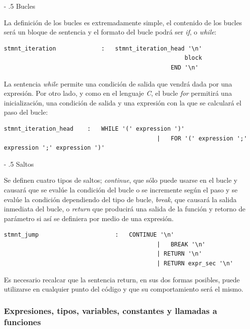 \documentclass[a4paper,10pt]{article}
\makeatletter
\renewcommand\paragraph{%
   \@startsection{paragraph}{4}{0mm}%
      {-\baselineskip}%
      {.5\baselineskip}%
      {\normalfont\normalsize\bfseries}}
\makeatother
\begin{document}
\paragraph{Bucles}

La definición de los bucles es extremadamente simple, el contenido de los bucles será un bloque de sentencia y el formato del bucle podrá ser \textit{if}, o \textit{while}:
\begin{lstlisting}
stmnt_iteration				:	stmnt_iteration_head '\n' 
													block 
												END '\n'
\end{lstlisting}

La sentencia \textit{while} permite una condición de salida que vendrá dada por una expresión. Por otro lado, y como en el lenguaje \textit{C}, el bucle \textit{for} permitirá una inicialización, una condición de salida y una expresión con la que se calculará el paso del bucle:

\begin{lstlisting}
stmnt_iteration_head	:	WHILE '(' expression ')' 
											|	FOR '(' expression ';' expression ';' expression ')'  
\end{lstlisting}


\paragraph{Saltos}

Se definen cuatro tipos de saltos; \textit{continue}, que sólo puede usarse en el bucle y causará que se evalúe la condición del bucle o se incremente según el paso y se evalúe la condición dependiendo del tipo de bucle, \textit{break}, que causará la salida inmediata del bucle, o \textit{return} que producirá una salida de la función y retorno de parámetro si así se definiera por medio de una expresión.

\begin{lstlisting}
stmnt_jump						:	CONTINUE '\n'
											|	BREAK '\n'
											| RETURN '\n'
											| RETURN expr_sec '\n'
\end{lstlisting}

Es necesario recalcar que la sentencia return, en sus dos formas posibles, puede utilizarse en cualquier punto del código y que su comportamiento será el mismo.

\subsubsection{Expresiones, tipos,  variables, constantes y llamadas a funciones}
\end{document}
